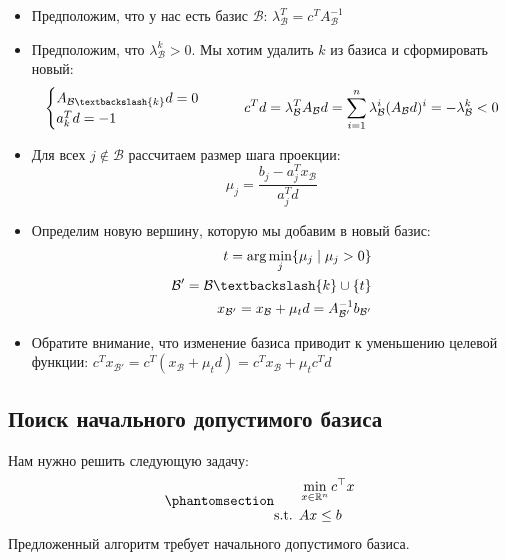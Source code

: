 \documentclass[
  russian,
  letterpaper,
  DIV=11,
  numbers=noendperiod]{scrartcl}
\begin{document}
\begin{itemize}
\item
  Предположим, что у нас есть базис \(\mathcal{B}\):
  \(\lambda^T_{\mathcal{B}} = c^T A_{\mathcal{B}}^{-1}\)
\item
  Предположим, что \(\lambda^k_{\mathcal{B}} > 0\). Мы хотим удалить
  \(k\) из базиса и сформировать новый: \[
     \begin{cases}
    A_{\mathcal{B} \textbackslash \{k\}} d = 0 \\
    a^T_k d = -1
    \end{cases} \qquad  c^Td   = \lambda^T_{\mathcal{B}} A_{\mathcal{B}} d  = \sum\limits_{i=1}^n \lambda^i_{\mathcal{B}}  (A_{\mathcal{B}} d)^i   = -\lambda^k_{\mathcal{B}} < 0 
    \]
\item
  Для всех \(j \notin \mathcal{B}\) рассчитаем размер шага проекции: \[
    \mu_j = \frac{b_j - a_j^T x_{\mathcal{B}}}{a_j^T d}
    \]
\item
  Определим новую вершину, которую мы добавим в новый базис: \[
    \begin{split}
    t = \text{arg}\min_j \{\mu_j \mid \mu_j > 0\} \\
    \mathcal{B}' = \mathcal{B}\textbackslash \{k\} \cup \{t\} \\ 
    x_{\mathcal{B'}} = x_{\mathcal{B}} + \mu_t d = A^{-1}_{\mathcal{B'}} b_{\mathcal{B'}}
    \end{split}
    \]
\item
  Обратите внимание, что изменение базиса приводит к уменьшению целевой
  функции:
  \(c^Tx_{\mathcal{B'}} = c^T(x_{\mathcal{B}} + \mu_t d) = c^Tx_{\mathcal{B}} + \mu_t c^Td\)
\end{itemize}

\subsection{Поиск начального допустимого
базиса}\label{ux43fux43eux438ux441ux43a-ux43dux430ux447ux430ux43bux44cux43dux43eux433ux43e-ux434ux43eux43fux443ux441ux442ux438ux43cux43eux433ux43e-ux431ux430ux437ux438ux441ux430}

Нам нужно решить следующую задачу:
\begin{equation}\phantomsection\label{eq-LP_ineq}{
\begin{split}
&\min_{x \in \mathbb{R}^n} c^{\top}x \\
\text{s.t. } & Ax \leq b
\end{split}
}\end{equation} Предложенный алгоритм требует начального допустимого
базиса.
\end{document}
